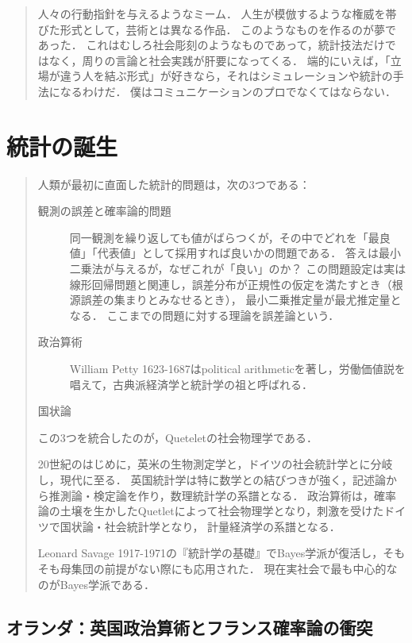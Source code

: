 \documentclass[uplatex,dvipdfmx]{jsreport}
\begin{document}
\begin{quotation}
    人々の行動指針を与えるようなミーム．
    人生が模倣するような権威を帯びた形式として，芸術とは異なる作品．
    このようなものを作るのが夢であった．
    これはむしろ社会彫刻のようなものであって，統計技法だけではなく，周りの言論と社会実践が肝要になってくる．
    端的にいえば，「立場が違う人を結ぶ形式」が好きなら，それはシミュレーションや統計の手法になるわけだ．
    僕はコミュニケーションのプロでなくてはならない．
\end{quotation}

\chapter{統計の誕生}

\begin{quotation}
    人類が最初に直面した統計的問題は，次の3つである：
    \begin{description}
        \item[観測の誤差と確率論的問題] 同一観測を繰り返しても値がばらつくが，その中でどれを「最良値」「代表値」として採用すれば良いかの問題である．
        答えは最小二乗法が与えるが，なぜこれが「良い」のか？
        この問題設定は実は線形回帰問題と関連し，誤差分布が正規性の仮定を満たすとき（根源誤差の集まりとみなせるとき），
        最小二乗推定量が最尤推定量となる．
        ここまでの問題に対する理論を誤差論という．
        \item[政治算術] William Petty 1623-1687はpolitical arithmeticを著し，労働価値説を唱えて，古典派経済学と統計学の祖と呼ばれる．
        \item[国状論] 
    \end{description}
    この3つを統合したのが，Queteletの社会物理学である．

    20世紀のはじめに，英米の生物測定学と，ドイツの社会統計学とに分岐し，現代に至る．
    英国統計学は特に数学との結びつきが強く，記述論から推測論・検定論を作り，数理統計学の系譜となる．
    政治算術は，確率論の土壌を生かしたQuetletによって社会物理学となり，刺激を受けたドイツで国状論・社会統計学となり，
    計量経済学の系譜となる．

    Leonard Savage 1917-1971の『統計学の基礎』でBayes学派が復活し，そもそも母集団の前提がない際にも応用された．
    現在実社会で最も中心的なのがBayes学派である．
\end{quotation}

\section{オランダ：英国政治算術とフランス確率論の衝突}
\end{document}

